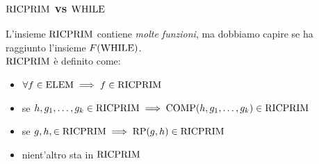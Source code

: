 \subsubsection{$\text{RICPRIM}$ vs $\text{WHILE}$}
L'insieme $\text{RICPRIM}$ contiene \textit{molte funzioni}, ma dobbiamo capire se ha raggiunto l'insieme $F(\text{WHILE})$.\\

$\text{RICPRIM}$ è definito come: 
\begin{itemize}
	\item $\forall f \in \text{ELEM} \implies f \in \text{RICPRIM}$
	\item se $h, g_1, \dots, g_k \in \text{RICPRIM} \implies \text{COMP}(h, g_1, \dots, g_k) \in \text{RICPRIM}$
	\item se $g,h, \in \text{RICPRIM} \implies \text{RP} (g,h) \in \text{RICPRIM}$
	\item nient'altro sta in $\text{RICPRIM}$ \\
\end{itemize}



